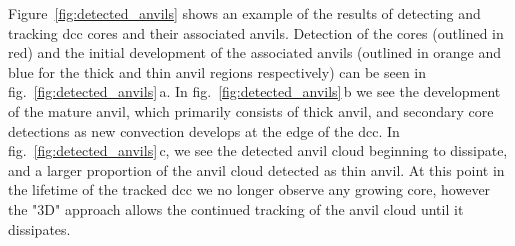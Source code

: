 Figure~\ref{fig:detected_anvils} shows an example of the results of detecting and tracking \acrshort{dcc} cores and their associated anvils.
Detection of the cores (outlined in red) and the initial development of the associated anvils (outlined in orange and blue for the thick and thin anvil regions respectively) can be seen in fig.~\ref{fig:detected_anvils}\,a.
In fig.~\ref{fig:detected_anvils}\,b we see the development of the mature anvil, which primarily consists of thick anvil, and secondary core detections as new convection develops at the edge of the \acrshort{dcc}.
In fig.~\ref{fig:detected_anvils}\,c, we see the detected anvil cloud beginning to dissipate, and a larger proportion of the anvil cloud detected as thin anvil.
At this point in the lifetime of the tracked \acrshort{dcc} we no longer observe any growing core, however the "3D" approach allows the continued tracking of the anvil cloud until it dissipates.


